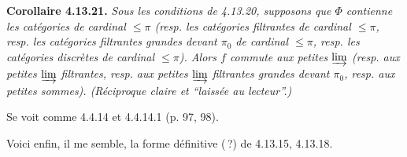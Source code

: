 \textbf{Corollaire 4.13.21.} \textit{Sous les conditions de 4.13.20, supposons que $\Phi$ contienne les catégories de cardinal $\leqslant\pi$ (resp. les catégories filtrantes de cardinal $\leqslant\pi$, resp. les catégories filtrantes grandes devant $\pi_0$ de cardinal $\leqslant\pi$, resp. les catégories discrètes de cardinal $\leqslant\pi$). Alors $f$ commute aux petites $\varinjlim$ (resp. aux petites $\varinjlim$ filtrantes, resp. aux petites $\varinjlim$ filtrantes grandes devant $\pi_0$, resp. aux petites sommes). (Réciproque claire et “laissée au lecteur”.)}

Se voit comme 4.4.14 et 4.4.14.1 (p. 97, 98).

Voici enfin, il me semble, la forme définitive (\,?) de 4.13.15, 4.13.18.

